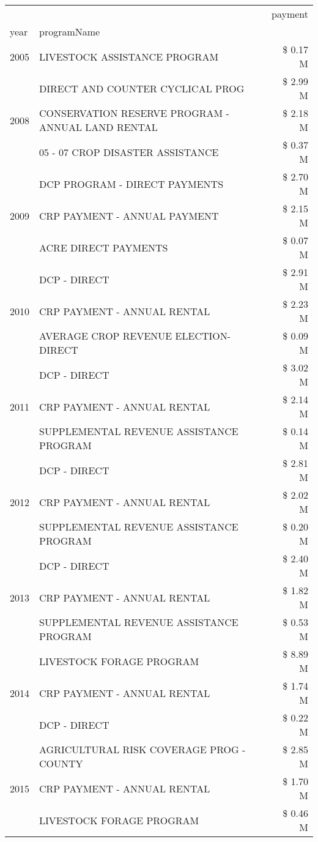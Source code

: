 \begin{tabular}{llr}
\toprule
 &  & payment \\
year & programName &  \\
\midrule
2005 & LIVESTOCK ASSISTANCE PROGRAM & \$ 0.17 M \\
\cline{1-3}
\multirow[t]{3}{*}{2008} & DIRECT AND COUNTER CYCLICAL PROG & \$ 2.99 M \\
 & CONSERVATION RESERVE PROGRAM - ANNUAL LAND RENTAL & \$ 2.18 M \\
 & 05 - 07 CROP DISASTER ASSISTANCE & \$ 0.37 M \\
\cline{1-3}
\multirow[t]{3}{*}{2009} & DCP PROGRAM - DIRECT PAYMENTS & \$ 2.70 M \\
 & CRP PAYMENT - ANNUAL PAYMENT & \$ 2.15 M \\
 & ACRE DIRECT PAYMENTS & \$ 0.07 M \\
\cline{1-3}
\multirow[t]{3}{*}{2010} & DCP - DIRECT & \$ 2.91 M \\
 & CRP PAYMENT - ANNUAL RENTAL & \$ 2.23 M \\
 & AVERAGE CROP REVENUE ELECTION-DIRECT & \$ 0.09 M \\
\cline{1-3}
\multirow[t]{3}{*}{2011} & DCP - DIRECT & \$ 3.02 M \\
 & CRP PAYMENT - ANNUAL RENTAL & \$ 2.14 M \\
 & SUPPLEMENTAL REVENUE ASSISTANCE PROGRAM & \$ 0.14 M \\
\cline{1-3}
\multirow[t]{3}{*}{2012} & DCP - DIRECT & \$ 2.81 M \\
 & CRP PAYMENT - ANNUAL RENTAL & \$ 2.02 M \\
 & SUPPLEMENTAL REVENUE ASSISTANCE PROGRAM & \$ 0.20 M \\
\cline{1-3}
\multirow[t]{3}{*}{2013} & DCP - DIRECT & \$ 2.40 M \\
 & CRP PAYMENT - ANNUAL RENTAL & \$ 1.82 M \\
 & SUPPLEMENTAL REVENUE ASSISTANCE PROGRAM & \$ 0.53 M \\
\cline{1-3}
\multirow[t]{3}{*}{2014} & LIVESTOCK FORAGE PROGRAM & \$ 8.89 M \\
 & CRP PAYMENT - ANNUAL RENTAL & \$ 1.74 M \\
 & DCP - DIRECT & \$ 0.22 M \\
\cline{1-3}
\multirow[t]{3}{*}{2015} & AGRICULTURAL RISK COVERAGE PROG - COUNTY & \$ 2.85 M \\
 & CRP PAYMENT - ANNUAL RENTAL & \$ 1.70 M \\
 & LIVESTOCK FORAGE PROGRAM & \$ 0.46 M \\

\end{tabular}
